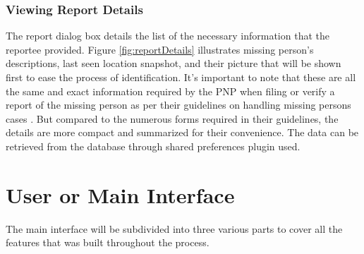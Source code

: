 \subsubsection{Viewing Report Details}

The report dialog box details the list of the necessary information that the reportee provided. Figure \ref{fig:reportDetails} illustrates missing person's descriptions, last seen location snapshot, and their picture that will be shown first to ease the process of identification. It's important to note that these are all the same and exact information required by the PNP when filing or verify a report of the missing person as per their guidelines on handling missing persons cases \cite{NationalPoliceCommission}. But compared to the numerous forms required in their guidelines, the details are more compact and summarized for their convenience. The data can be retrieved from the database through shared preferences plugin used.

\section{User or Main Interface}
The main interface will be subdivided into three various parts to cover all the features that was built throughout the process.


